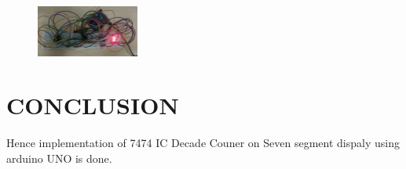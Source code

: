 \documentclass[conference]{IEEEtran}
\begin{document}
\begin{figure}[h]
\centering
\includegraphics[width=0.3\textwidth]{fwc2.jpg}                                                  \caption{\label{fig-7:Gates}}
\end{figure}


\section{CONCLUSION}
Hence implementation of 7474 IC Decade Couner on Seven segment dispaly using arduino UNO is done.                                               
\end{document}
